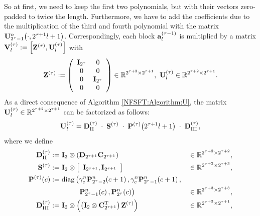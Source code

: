 So at first, we need to keep the first two polynomials, but with their vectors zero-padded to twice the length. Furthermore, we have to add 
the coefficients due to the multiplication of the third and fourth polynomial with the matrix $\mathbf{U}_{2^{\tau}-1}^{n}{\hspace{-0.4ex}}\left(\cdot,2^{\tau+1}l+1\right)$.
Correspondingly, each block $\mathbf{a}_{l}^{(\tau-1)}$ is multiplied by a matrix $\mathbf{V}^{(\tau)}_l := \left[\mathbf{Z^{(\tau)}},\mathbf{U}^{(\tau)}_l\right]$ with
\[\V{Z}^{(\tau)} := \left(\begin{array}{cccc} \V{I}_{2^{\tau}} & 0\\ 0 & 0 \\ 0 & \V{I}_{2^{\tau}} \\ 0 & 0 \end{array}\right) \in \R^{2^{\tau+2} \times 2^{\tau+1}},\ \V{U}^{(\tau)}_l \in \R^{2^{\tau+2} \times 2^{\tau+1}}.\]
As a direct consequence of Algorithm \ref{NFSFT:Algorithm:U}, the matrix $\mathbf{U}^{(\tau)}_l \in \mathbb{R}^{2^{\tau+2} \times 2^{\tau+1}}$ can be factorized as follows:
\begin{equation} 
  \label{NFSFT:LinearAlgebra:Factorization}
  \mathbf{U}^{(\tau)}_l = \mathbf{D}^{(\tau)}_{\text{II}} \; \cdot \; \mathbf{S}^{(\tau)} \; \cdot \; \mathbf{P}^{(\tau)}{\hspace{-0.4ex}}\left(2^{\tau + 1}l+1\right) \; \cdot \; \mathbf{D}^{(\tau)}_{\text{III}},
\end{equation}
where we define
\begin{align*}
  \mathbf{D}^{(\tau)}_{\text{II}} & := \mathbf{I}_{2} \otimes \left(\mathbf{D}_{2^{\tau+1}} \mathbf{C}_{2^{\tau+1}}\right) & \in \mathbb{R}^{2^{\tau+2} \times 2^{\tau+2}},\\
  \mathbf{S}^{(\tau)} & := \mathbf{I}_2 \otimes \left[\begin{array}{cc}\mathbf{I}_{2^{\tau+1}},\mathbf{I}_{2^{\tau+1}}\end{array}\right] & \in \mathbb{R}^{2^{\tau+2} \times 2^{\tau+3}},\\
  \mathbf{P}^{(\tau)}{\hspace{-0.4ex}}\left(c\right) & := \text{diag}\left(\gamma_{c}^n \mathbf{P}_{2^{\tau}-2}^n{\hspace{-0.4ex}}\left(c+1\right),\gamma_{c}^n \mathbf{P}_{2^{\tau}-1}^n{\hspace{-0.4ex}}\left(c+1\right),\right.\\
    & \left. \hspace{9ex} \mathbf{P}_{2^{\tau}-1}^n{\hspace{-0.4ex}}\left(c\right), \mathbf{P}_{2^{\tau}}^n{\hspace{-0.4ex}}\left(c\right)\right) & \in \mathbb{R}^{2^{\tau+3} \times 2^{\tau+3}},\\
  \mathbf{D}^{(\tau)}_{\text{III}} & := \mathbf{I}_{2} \otimes \left(\left(\mathbf{I}_{2} \otimes \mathbf{C}^{\text{\rm{T}}}_{2^{\tau+1}}\right)\mathbf{Z}^{(\tau)}\right) & \in \mathbb{R}^{2^{\tau+3} \times 2^{\tau+1}},
\end{align*}   
